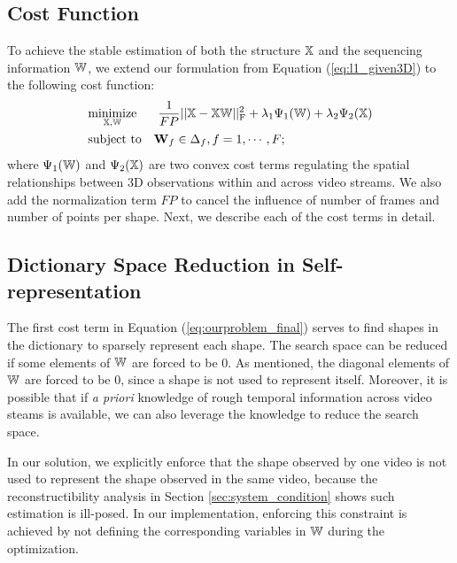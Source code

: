 \subsection{Cost Function}
To achieve the stable estimation of both the structure $\mathbb X$ and the sequencing information $\mathbb W$, we extend our formulation from Equation (\ref{eq:l1_given3D}) to the following cost function:
\begin{equation}
\begin{aligned}
& \underset{\mathbb X, \mathbb W}{\text{minimize}}&& ~ \frac{1}{FP} || \mathbb X - \mathbb X\mathbb W||_\text{F}^2
 + \lambda_1\Psi_1(\mathbb W) + \lambda_2 \Psi_2(\mathbb X) \\
& \text{subject to} && \mathbf W_f \in \Delta_f, f=1,\cdots,F;
\end{aligned}
\label{eq:ourproblem_final}
\end{equation}
where $\Psi_1(\mathbb W)$ and  $\Psi_2(\mathbb X)$ are two convex cost terms regulating the spatial relationships between 3D observations within and across video streams. We also add the normalization term $FP$ to cancel the influence of number of frames and number of points per shape. Next, we describe each of the cost terms in detail.

\subsection{Dictionary Space Reduction in Self-representation}
The first cost term in Equation (\ref{eq:ourproblem_final}) serves to find shapes in the dictionary to sparsely represent each shape. The search space can be reduced if some elements of $\mathbb W$ are forced to be 0. As mentioned, the diagonal elements of $\mathbb W$ are forced to be 0, since a shape is not used to represent itself. Moreover, it is possible that if {\em a priori} knowledge of rough temporal information across video steams is available, we can also leverage the knowledge to reduce the search space.

In our solution, we explicitly enforce that the shape observed by one video is not used to represent the shape observed in the same video, because 
the reconstructibility analysis in Section \ref{sec:system_condition} shows such estimation is ill-posed. In our implementation, enforcing this constraint is achieved by not defining the corresponding variables in $\mathbb W$ during the optimization.

